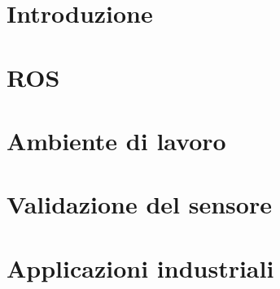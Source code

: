 \thispagestyle{empty} %
\cleardoublepage

\thispagestyle{empty}

\clearpage{\pagestyle{plain}\cleardoublepage}


\clearpage{\pagestyle{plain}\cleardoublepage}
\tableofcontents %

\clearpage{\pagestyle{plain}\cleardoublepage} %

\clearpage{\pagestyle{plain}\cleardoublepage} %
\chapter*{Introduzione} %

\clearpage{\pagestyle{plain}\cleardoublepage} %
\chapter{ROS} %
\label{chapter:chapter1} %

\clearpage{\pagestyle{plain}\cleardoublepage} %
\chapter{Ambiente di lavoro} %
\label{chapter:chapter2} %

\clearpage{\pagestyle{plain}\cleardoublepage} %
\chapter{Validazione del sensore} %
\label{chapter:chapter3} %

\clearpage{\pagestyle{plain}\cleardoublepage} %
\chapter{Applicazioni industriali} %
\label{chapter:chapter4} %


